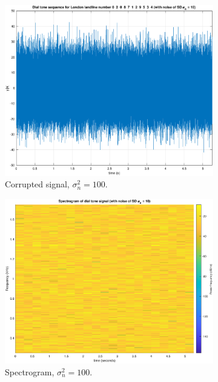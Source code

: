 \begin{figure}[H]
\begin{subfigure}{.32\textwidth}
  \includegraphics[width=\linewidth]{assignment3figs/sig_sd10.eps}  
  \caption{Corrupted signal, $\sigma_{n}^{2} = 100$.}
\end{subfigure}
\begin{subfigure}{.32\textwidth}
  \centering
  \includegraphics[width=\linewidth]{assignment3figs/spec_sd10.eps}  
  \caption{Spectrogram, $\sigma_{n}^{2} = 100$.}
\end{subfigure}
\begin{subfigure}{.32\textwidth}
  \centering

\end{subfigure}
\end{figure}
